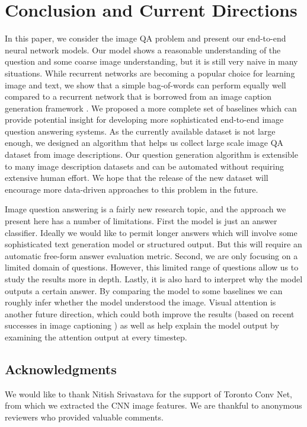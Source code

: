 \documentclass{article}
\renewcommand{\#}[1]{\textbf{#1}}
\begin{document}
\section{Conclusion and Current Directions}
In this paper, we consider the image QA problem and present our 
end-to-end neural network models. Our model shows a reasonable 
understanding of the question and some coarse image understanding, 
but it is still very naive in many situations. 
While recurrent networks are becoming a popular choice for learning 
image and text, we show that a simple bag-of-words can 
perform equally well compared to a recurrent network that 
is borrowed from an image caption generation framework \cite{vinyals14}. 
We proposed a more complete set of baselines which can 
provide potential insight 
for developing more sophisticated 
end-to-end image question answering systems.
As the currently available dataset is not large enough, 
we designed an algorithm that helps us collect large scale image 
QA dataset from image descriptions. Our question 
generation algorithm is extensible to many image description datasets 
and can be automated without requiring extensive human effort. We 
hope that the release of the new dataset will encourage more 
data-driven approaches to this problem in the future.

Image question answering is a fairly new research topic, and the approach we
present here has a number of limitations. First the model is just an answer
classifier. Ideally we would like to permit longer answers which will involve
some sophisticated text generation model or structured output. But 
this will require an automatic free-form answer evaluation metric. Second, we are 
only focusing on a limited domain of questions. However, this limited range
of questions allow us to study the results more in depth. Lastly, it is also hard to 
interpret why the model outputs a certain
answer. By comparing the model to some baselines we can roughly infer whether 
the model understood the image.
Visual attention is another future direction, which could both 
improve the results (based on recent successes in image captioning \cite{xu15}) 
as well as help explain the model output by examining the attention output at every
timestep.

\subsection*{Acknowledgments}
We would like to thank Nitish Srivastava for the support of Toronto 
Conv Net, from which we extracted the CNN image features. We are thankful to anonymous reviewers who provided valuable comments.
\end{document}
